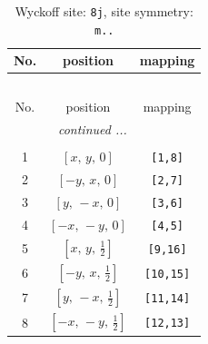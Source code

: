 \documentclass[fleqn,8pt]{jsarticle}
\begin{document}
\begin{longtable}{ccc}
\caption{Wyckoff site: {\tt 8j}, site symmetry: {\tt m..}}
 \\
 \hline \hline
No. & position & mapping \\ \hline \endfirsthead

\multicolumn{2}{l}{\tablename\ \thetable{}} \\
 \hline \hline
No. & position & mapping \\ \hline \endhead

 \hline \hline
\multicolumn{2}{r}{\footnotesize\it continued ...} \\ \endfoot

 \hline \hline
\multicolumn{2}{r}{} \\ \endlastfoot

1 & $\left[ x,\, y,\, 0 \right]$ & {\tt [1,8]} \\ \hline
2 & $\left[ - y,\, x,\, 0 \right]$ & {\tt [2,7]} \\ \hline
3 & $\left[ y,\, - x,\, 0 \right]$ & {\tt [3,6]} \\ \hline
4 & $\left[ - x,\, - y,\, 0 \right]$ & {\tt [4,5]} \\ \hline
5 & $\left[ x,\, y,\, \frac{1}{2} \right]$ & {\tt [9,16]} \\ \hline
6 & $\left[ - y,\, x,\, \frac{1}{2} \right]$ & {\tt [10,15]} \\ \hline
7 & $\left[ y,\, - x,\, \frac{1}{2} \right]$ & {\tt [11,14]} \\ \hline
8 & $\left[ - x,\, - y,\, \frac{1}{2} \right]$ & {\tt [12,13]} \\
\end{longtable}
\renewcommand{\arraystretch}{1.2}
\end{document}
